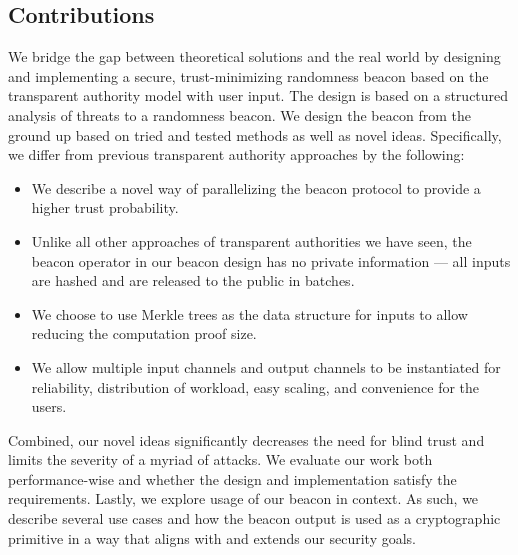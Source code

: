 \subsection{Contributions}
We bridge the gap between theoretical solutions and the real world by designing and implementing a secure, trust-minimizing randomness beacon based on the transparent authority model with user input.
The design is based on a structured analysis of threats to a randomness beacon.
We design the beacon from the ground up based on tried and tested methods as well as novel ideas.
Specifically, we differ from previous transparent authority approaches by the following:
\begin{itemize}
    \item We describe a novel way of parallelizing the beacon protocol to provide a higher trust probability.
    \item Unlike all other approaches of transparent authorities we have seen, the beacon operator in our beacon design has no private information --- all inputs are hashed and are released to the public in batches.
    \item We choose to use Merkle trees as the data structure for inputs to allow reducing the computation proof size.
    \item We allow multiple input channels and output channels to be instantiated for reliability, distribution of workload, easy scaling, and convenience for the users.
\end{itemize}
Combined, our novel ideas significantly decreases the need for blind trust and limits the severity of a myriad of attacks.
We evaluate our work both performance-wise and whether the design and implementation satisfy the requirements.
Lastly, we explore usage of our beacon in context.
As such, we describe several use cases and how the beacon output is used as a cryptographic primitive in a way that aligns with and extends our security goals.

